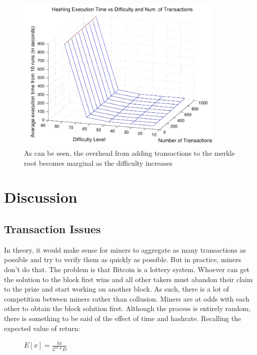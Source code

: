 \documentclass[pdftex,11pt]{article}
\begin{document}
\begin{figure}[H]
	\centering
	\includegraphics[width=100mm]{figures/3Dplot-eps-converted-to.pdf}
	\caption{As can be seen, the overhead from adding transactions to the merkle root becomes marginal as the difficulty increases}
	\label{3dgraph}
\end{figure}



\section{Discussion}

\subsection{Transaction Issues}
In theory, it would make sense for miners to aggregate as many transactions as possible and try to verify them as quickly as possible. But in practice, miners don't do that. The problem is that Bitcoin is a lottery system. Whoever can get the solution to the block first wins and all other takers must abandon their claim to the prize and start working on another block. As such, there is a lot of competition between miners rather than collusion. Miners are at odds with each other to obtain the block solution first. Although the process is entirely random, there is something to be said of the effect of time and hashrate. Recalling the expected value of return:

\begin{figure}[H]
	\centering
 	$E[x] = \frac{ht}{2^{32}*D}$
 \end{figure}
\end{document}
